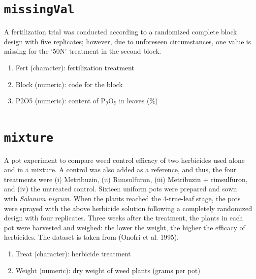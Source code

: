 \documentclass[
  letterpaper,
  DIV=11,
  numbers=noendperiod]{scrreprt}
\providecommand{\tightlist}{%
  \setlength{\itemsep}{0pt}\setlength{\parskip}{0pt}}
\begin{document}
\section*{\texorpdfstring{\texttt{missingVal}}{missingVal}}\label{missingval}


A fertilization trial was conducted according to a randomized complete
block design with five replicates; however, due to unforeseen
circumstances, one value is missing for the `50N' treatment in the
second block.

\begin{enumerate}
\def\labelenumi{\arabic{enumi}.}
\tightlist
\item
  Fert (character): fertilization treatment
\item
  Block (numeric): code for the block
\item
  P2O5 (numeric): content of P\textsubscript{2}O\textsubscript{5} in
  leaves (\%)
\end{enumerate}

\section*{\texorpdfstring{\texttt{mixture}}{mixture}}\label{mixture}


A pot experiment to compare weed control efficacy of two herbicides used
alone and in a mixture. A control was also added as a reference, and
thus, the four treatments were (i) Metribuzin, (ii) Rimsulfuron, (iii)
Metribuzin + rimsulfuron, and (iv) the untreated control. Sixteen
uniform pots were prepared and sown with \emph{Solanum nigrum}. When the
plants reached the 4-true-leaf stage, the pots were sprayed with the
above herbicide solution following a completely randomized design with
four replicates. Three weeks after the treatment, the plants in each pot
were harvested and weighed: the lower the weight, the higher the
efficacy of herbicides. The dataset is taken from (Onofri et al. 1995).

\begin{enumerate}
\def\labelenumi{\arabic{enumi}.}
\tightlist
\item
  Treat (character): herbicide treatment
\item
  Weight (numeric): dry weight of weed plants (grams per pot)
\end{enumerate}
\end{document}
